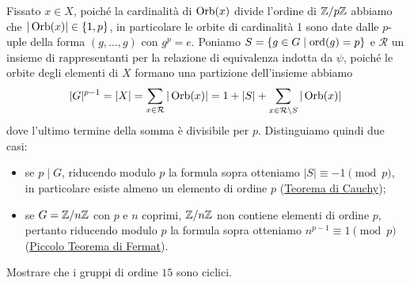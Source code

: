 \documentclass[11pt]{scrartcl}
\begin{document}
Fissato $x \in X$, poiché la cardinalità di $\operatorname{Orb}(x)$ divide l'ordine di ${\mathbb Z}/p{\mathbb Z}$
abbiamo che $|\operatorname{Orb}(x)| \in \{1, p\}$, in particolare le orbite di cardinalità
1 sono date dalle $p$-uple della forma $(g, \ldots, g)$ con $g^p = e$.
Poniamo $S = \{g\in G \mid \operatorname{ord}(g) = p\}$ e $\mathcal{R}$ un insieme di 
rappresentanti per la relazione di equivalenza indotta da $\psi$, poiché 
le orbite degli elementi di $X$ formano una partizione dell'insieme abbiamo
\[
    |G|^{p - 1} = |X| = \sum_{x \in \mathcal{R}} |\operatorname{Orb}(x)| = 1 + |S| + \sum_{x \in \mathcal{R}\setminus S}|\operatorname{Orb}(x)|
\]dove l'ultimo termine della somma è divisibile per $p$. Distinguiamo 
quindi due casi:
\begin{itemize}
    \item se $p\mid G$, riducendo modulo $p$ la formula sopra otteniamo
    $|S| \equiv -1 \pmod p$, in particolare esiste almeno un elemento di
    ordine $p$ (\hyperref[teorema1.0]{Teorema di Cauchy});
    \item se $G = {\mathbb Z}/n{\mathbb Z}$ con $p$ e $n$ coprimi, ${\mathbb Z}/n{\mathbb Z}$ non contiene elementi
    di ordine $p$, pertanto riducendo modulo $p$ la formula sopra otteniamo
    $n^{p - 1} \equiv 1 \pmod p$ (\hyperref[teorema2.0]{Piccolo Teorema di Fermat}).
\end{itemize}

\begin{exercise}
    Mostrare che i gruppi di ordine $15$ sono ciclici.
\end{exercise}
\end{document}
